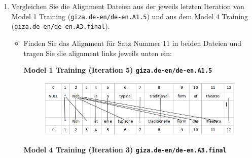 \documentclass[12pt,fleqn]{article}
\begin{document}
\begin{enumerate}
\begin{enumerate}
\begin{itemize}
\end{itemize}

\vspace{0.5cm} 
\item Vergleichen Sie die Alignment Dateien aus der jeweils letzten Iteration von Model 1 Training (\texttt{giza.de-en/de-en.A1.5}) und aus dem Model 4 Training (\texttt{giza.de-en/de-en.A3.final}).

\vspace{0.5cm} 
\begin{itemize} 
 \item Finden Sie das Alignment für Satz Nummer 11 in beiden Dateien und tragen Sie die alignment links jeweils unten ein:  
 
 
 \vspace{0.5cm}
  \textbf{Model 1 Training (Iteration 5) \texttt{giza.de-en/de-en.A1.5}} \\ 
  

\begin{figure} [h]
 \includegraphics[width=15cm]{2c_sol1.png} 
\end{figure}



 \vspace{0.5cm}
 \textbf{Model 4 Training (Iteration 3) \texttt{giza.de-en/de-en.A3.final}} \\ 
 

\end{itemize}
\end{enumerate}
\end{enumerate}
\end{document}
